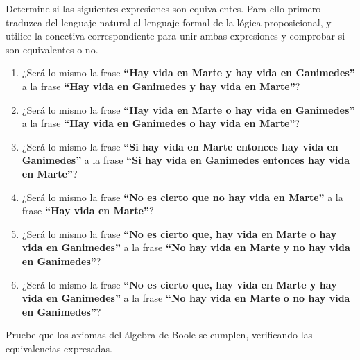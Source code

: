 \begin{exercise}
    Determine si las siguientes expresiones son equivalentes. Para ello primero
    traduzca del lenguaje natural al lenguaje formal de la lógica proposicional,
    y utilice la conectiva correspondiente para unir ambas expresiones y
    comprobar si son equivalentes o no.

    \begin{enumerate}
      \item
        ¿Será lo mismo la frase \textbf{``Hay vida en Marte y hay vida en
        Ganimedes''} a la frase \textbf{``Hay vida en Ganimedes y hay vida en
        Marte''}?

      \item
        ¿Será lo mismo la frase \textbf{``Hay vida en Marte o hay vida en
        Ganimedes''} a la frase \textbf{``Hay vida en Ganimedes o hay vida en
        Marte''}?

      \item
        ¿Será lo mismo la frase \textbf{``Si hay vida en Marte entonces hay vida
        en Ganimedes''} a la frase \textbf{``Si hay vida en Ganimedes entonces
        hay vida en Marte''}?

      \item
        ¿Será lo mismo la frase \textbf{``No es cierto que no hay vida en
        Marte''} a la frase \textbf{``Hay vida en Marte''}?

      \item
        ¿Será lo mismo la frase \textbf{``No es cierto que, hay vida en Marte o
        hay vida en Ganimedes''} a la frase \textbf{``No hay vida en Marte y no
        hay vida en Ganimedes''}?


      \item
        ¿Será lo mismo la frase \textbf{``No es cierto que, hay vida en Marte y
        hay vida en Ganimedes''} a la frase \textbf{``No hay vida en Marte o no
        hay vida en Ganimedes''}?

    \end{enumerate}
\end{exercise}

\begin{exercise}
    Pruebe que los axiomas del álgebra de Boole se cumplen, verificando las
    equivalencias expresadas.
\end{exercise}
